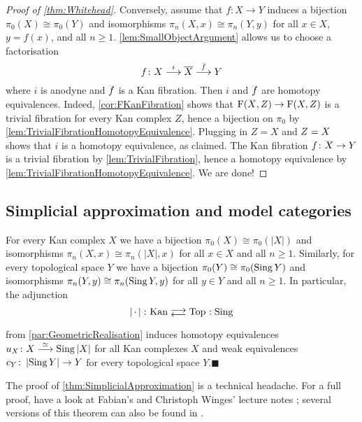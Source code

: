 \begin{proof}[Proof of \cref{thm:Whitehead}]
	Conversely, assume that $f\colon X\rightarrow Y$ induces a bijection $\pi_0(X)\cong \pi_0(Y)$ and isomorphisms $\pi_n(X,x)\cong \pi_n(Y,y)$ for all $x\in X$, $y=f(x)$, and all $n\geqslant 1$. \cref{lem:SmallObjectArgument} allows us to choose a factorisation
	\begin{equation*}
		f\colon X\overset{i}{\longrightarrow} \ov X\overset{\ov f}{\longrightarrow}Y
	\end{equation*}
	where $i$ is anodyne and $\ov f$ is a Kan fibration. Then $i$ and $\ov f$ are homotopy equivalences. Indeed, \cref{cor:FKanFibration} shows that $\F(\ov X,Z)\rightarrow\F(X,Z)$ is a trivial fibration for every Kan complex $Z$, hence a bijection on $\pi_0$ by \cref{lem:TrivialFibrationHomotopyEquivalence}. Plugging in $Z=X$ and $Z=\ov X$ shows that $i$ is a homotopy equivalence, as claimed.  The Kan fibration $\ov f\colon \ov X\rightarrow Y$ is a trivial fibration by \cref{lem:TrivialFibration}, hence a homotopy equivalence by \cref{lem:TrivialFibrationHomotopyEquivalence}. We are done!
\end{proof}

\subsection{Simplicial approximation and model categories}

\begin{thm}\label{thm:SimplicialApproximation}
	For every Kan complex $X$ we have a bijection $\pi_0(X)\cong \pi_0(\left|X\right|)$ and isomorphisms $\pi_n(X,x)\cong \pi_n(\left|X\right|,x)$ for all $x\in X$ and all $n\geqslant 1$. Similarly, for every topological space $Y$ we have a bijection $\pi_0(Y)\cong \pi_0(\operatorname{Sing} Y)$ and isomorphisms $\pi_n(Y,y)\cong \pi_n(\operatorname{Sing} Y,y)$ for all $y\in Y$ and all $n\geqslant 1$. In particular, the adjunction
	\begin{equation*}
		\left|\,\cdot\,\right|\colon \cat{Kan}\doublelrmorphism \cat{Top}\noloc \Sing
	\end{equation*}
	from \cref{par:GeometricRealisation} induces homotopy equivalences $u_X\colon X\overset{\simeq}{\longrightarrow} \operatorname{Sing}\left|X\right|$ for all Kan complexes $X$ and weak equivalences $c_Y\colon \left|\operatorname{Sing} Y\right|\rightarrow Y$ for every topological space $Y$.\hfill$\blacksquare$
\end{thm}
The proof of \cref{thm:SimplicialApproximation} is a technical headache. For a full proof, have a look at Fabian's and Christoph Winges' lecture notes \cite[\S V.5]{HigherCatsI}; several versions of this theorem can also be found in \cite[\S \href{https://pi.math.cornell.edu/~hatcher/AT/AT.pdf\#page=186}{2.C}]{Hatcher}.

